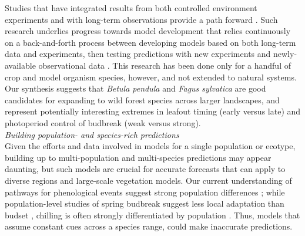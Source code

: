 \documentclass[11pt,letter]{article}
\newcommand{\R}[1]{\label{#1}\linelabel{#1}}
\begin{document}
Studies that have integrated results from both controlled environment experiments and with long-term observations provide a path forward \citep{Caffarra:2011qf,satake2013,chuinearees}. Such research underlies progress towards model development that relies continuously on a back-and-forth process between developing models based on both long-term data and experiments, then testing predictions with new experiments and newly-available observational data \citep{satake2013}. This research has been done only for a handful of crop and model organism species, however, and not extended to natural systems. Our synthesis suggests that \emph{Betula pendula} and \emph{Fagus sylvatica} are good candidates for expanding to wild forest species across larger landscapes, and represent potentially interesting extremes in leafout timing (early versus late) and photoperiod control of budbreak (weak versus strong).\\ %

\emph{Building population- and species-rich predictions} \\
\R{r2popstart}Given the efforts and data involved in models for a single population or ecotype, building up to multi-population and multi-species predictions may appear daunting, but such models are crucial for accurate forecasts that can apply to diverse regions and large-scale vegetation models. Our current understanding of pathways for phenological events suggest strong population differences \citep{Wilczek:2009oa,Tanino2010}; while population-level studies of spring budbreak suggest less local adaptation than budset \citep{Aitken:2008}, chilling is often strongly differentiated by population \citep{Junttila:2012aa}. Thus, models that assume constant cues across a species range, could make inaccurate predictions. \\
\end{document}
